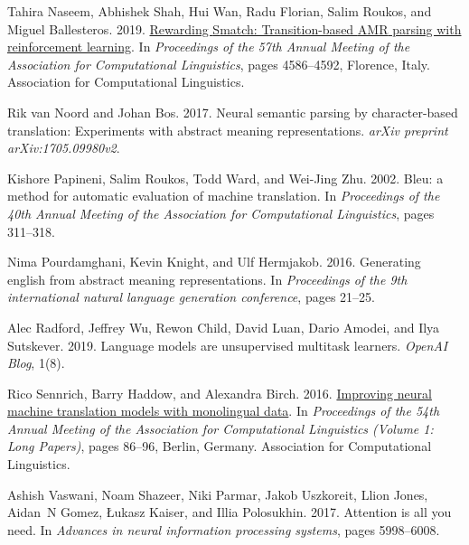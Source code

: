 \documentclass[11pt,a4paper]{article}
\begin{document}
\begin{thebibliography}{27}
Tahira Naseem, Abhishek Shah, Hui Wan, Radu Florian, Salim Roukos, and Miguel
  Ballesteros. 2019.
\newblock \href {https://doi.org/10.18653/v1/P19-1451} {Rewarding {S}match:
  Transition-based {AMR} parsing with reinforcement learning}.
\newblock In \emph{Proceedings of the 57th Annual Meeting of the Association
  for Computational Linguistics}, pages 4586--4592, Florence, Italy.
  Association for Computational Linguistics.

Rik van Noord and Johan Bos. 2017.
\newblock Neural semantic parsing by character-based translation: Experiments
  with abstract meaning representations.
\newblock \emph{arXiv preprint arXiv:1705.09980v2}.

Kishore Papineni, Salim Roukos, Todd Ward, and Wei-Jing Zhu. 2002.
\newblock Bleu: a method for automatic evaluation of machine translation.
\newblock In \emph{Proceedings of the 40th Annual Meeting of the Association
  for Computational Linguistics}, pages 311--318.

Nima Pourdamghani, Kevin Knight, and Ulf Hermjakob. 2016.
\newblock Generating english from abstract meaning representations.
\newblock In \emph{Proceedings of the 9th international natural language
  generation conference}, pages 21--25.

Alec Radford, Jeffrey Wu, Rewon Child, David Luan, Dario Amodei, and Ilya
  Sutskever. 2019.
\newblock Language models are unsupervised multitask learners.
\newblock \emph{OpenAI Blog}, 1(8).

Rico Sennrich, Barry Haddow, and Alexandra Birch. 2016.
\newblock \href {https://doi.org/10.18653/v1/P16-1009} {Improving neural
  machine translation models with monolingual data}.
\newblock In \emph{Proceedings of the 54th Annual Meeting of the Association
  for Computational Linguistics (Volume 1: Long Papers)}, pages 86--96, Berlin,
  Germany. Association for Computational Linguistics.

Ashish Vaswani, Noam Shazeer, Niki Parmar, Jakob Uszkoreit, Llion Jones,
  Aidan~N Gomez, {\L}ukasz Kaiser, and Illia Polosukhin. 2017.
\newblock Attention is all you need.
\newblock In \emph{Advances in neural information processing systems}, pages
  5998--6008.


\end{thebibliography}
\end{document}
